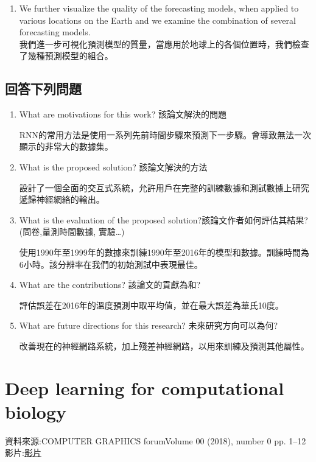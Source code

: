 \begin{enumerate}
\item We further visualize the quality of the forecasting models, when applied to various locations on the Earth and we examine the combination of several forecasting models.\\
我們進一步可視化預測模型的質量，當應用於地球上的各個位置時，我們檢查了幾種預測模型的組合。

\end{enumerate}

\subsection{回答下列問題}

\begin{enumerate}
\item  What are motivations for this work? 該論文解決的問題  

RNN的常用方法是使用一系列先前時間步驟來預測下一步驟。會導致無法一次顯示的非常大的數據集。

\item  What is the proposed solution? 該論文解決的方法

設計了一個全面的交互式系統，允許用戶在完整的訓練數據和測試數據上研究遞歸神經網絡的輸出。

\item  What is the evaluation of the proposed solution?該論文作者如何評估其結果? (問卷,量測時間數據, 實驗…)

使用1990年至1999年的數據來訓練1990年至2016年的模型和數據。訓練時間為6小時。該分辨率在我們的初始測試中表現最佳。

\item  What are the contributions? 該論文的貢獻為和?

評估誤差在2016年的溫度預測中取平均值，並在最大誤差為華氏10度。

\item  What are future directions for this research? 未來研究方向可以為何?

改善現在的神經網路系統，加上殘差神經網路，以用來訓練及預測其他屬性。

\end{enumerate}


\section{Deep learning for computational biology}
資料來源:{COMPUTER GRAPHICS forumVolume 00 (2018), number 0 pp. 1–12 \cite{Roesch2017VisualizationON}}
\\
影片:\href{Visualization of Neural Network Predictions for Weather Forecasting (VMV 2017).mp4}{影片}
      
